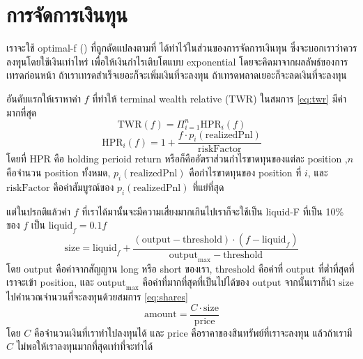 \section{การจัดการเงินทุน}
เราจะใช้ optimal-f (\cite{Vince}) ที่ถูกดัดแปลงตามที่ \cite{Rodrigo} ได้ทำไว้ในส่วนของการจัดการเงินทุน ซึ่งจะบอกเราว่าควรลงทุุนโดยใช้เงินเท่าไหร่ เพื่อให้เงินกำไรเติบโตแบบ
exponential โดยจะคิดมาจากผลลัพธ์ของการเทรดก่อนหน้า ถ้าเราเทรดสำเร็จเยอะก็จะเพิ่มเงินที่จะลงทุน ถ้าเทรดพลาดเยอะก็จะลดเงินที่จะลงทุน 

อันดับแรกให้เราหาค่า $f$ ที่ทำให้ terminal wealth relative ($\text{TWR}$) ในสมการ \ref{eq:twr} มีค่ามากที่สุด
\begin{equation}
    \text{TWR}(f) = \Pi_{i=1}^{n} \text{HPR}_i(f)
\label{eq:twr}
\end{equation}
\begin{equation}
    \text{HPR}_i(f) = 1 + \frac{f \cdot p_i(\text{realizedPnl})}{\text{riskFactor}}
\end{equation}
โดยที่ $\text{HPR}$ คือ holding perioid return หรือก็คืออัตราส่วนกำไรขาดทุนของแต่ละ position 
,$n$ คือจำนวน position ทั้งหมด, $p_i(\text{realizedPnl})$ คือกำไรขาดทุนของ position ที่ $i$, 
และ $\text{riskFactor}$ คือค่าสัมบูรณ์ของ $p_i(\text{realizedPnl})$ ที่แย่ที่สุด

แต่ในปรกติแล้วค่า $f$ ที่เราได้มานั้นจะมีความเสี่ยงมากเกินไปเราก็จะใช้เป็น liquid-F ที่เป็น 10\% ของ $f$ เป็น $\text{liquid}_f = 0.1f$ 
\begin{equation}
\text{size} = \text{liquid}_f + \frac{(\text{output} - \text{threshold}) \cdot (f - \text{liquid}_f)}{\text{output}_{\text{max}} - \text{threshold}}
\end{equation}
โดย $\text{output}$ คือค่าจากสัญญาน long หรือ short ของเรา, $\text{threshold}$ คือค่าที่ $\text{output}$ ที่ต่ำที่สุดที่เราจะเข้า position, และ 
$\text{output}_{\text{max}}$ คือค่าที่มากที่สุดที่เป็นไปได้ของ $\text{output}$ จากนั้นเราก็นำ $\text{size}$ ไปคำนวณจำนวนที่จะลงทุนด้วยสมการ \ref{eq:shares}
\begin{equation}
\text{amount} = \frac{C \cdot \text{size}}{\text{price}}
\label{eq:shares}
\end{equation}
โดย $C$ คือจำนวนเงินที่เราทำไปลงทุนได้ และ $\text{price}$ คือราคาของสินทรัพย์ที่เราจะลงทุน แล้วถ้าเรามี $C$ ไม่พอให้เราลงทุนมากที่สุดเท่าที่จะทำได้

